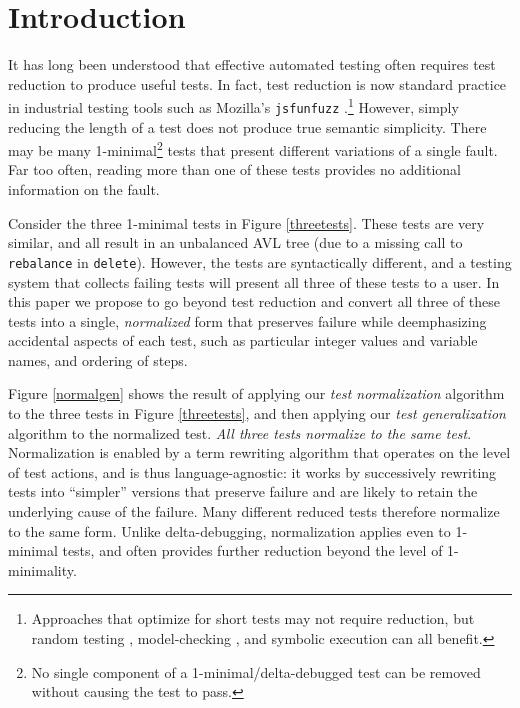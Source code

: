 \section{Introduction}

It has long been understood that effective automated testing often requires
test reduction \cite{DD,MinUnit,TCminim,ICSEDiff} to produce useful tests.  In fact, test reduction is
now standard practice in industrial testing tools such as Mozilla's
{\tt jsfunfuzz} \cite{jsfunfuzz,jsfunfuzz2,lithium}.\footnote{Approaches that
  optimize for short tests \cite{SoftBET,FA11} may not require reduction, but random
  testing \cite{RandFormal,HamletOnly}, model-checking
  \cite{Gastin04minimizationof}, and symbolic execution \cite{issta14}
  can all benefit.}  However, simply reducing the length of a test
does not produce true semantic simplicity.  There may be many
1-minimal\footnote{No
  single component of a 1-minimal/delta-debugged \cite{DD} test can be removed without
  causing the test to pass.} tests
that present different variations of a single fault.  Far too often,
reading more than one of these tests provides no
additional information on the fault.

Consider the three 1-minimal tests in Figure
\ref{threetests}.  These tests are very similar, and all result
in an unbalanced AVL tree (due to a missing call to {\tt rebalance} in
{\tt delete}).  However, the tests are syntactically different,
and a testing system that collects failing tests will present all
three of these tests to a user.  In this paper we propose to go beyond test reduction
and convert all three of these
tests into a single, \emph{normalized} form that preserves failure
while deemphasizing accidental aspects of each test, such as
particular integer values and variable names, and ordering of steps.

Figure \ref{normalgen} shows the result of applying our \emph{test
  normalization} algorithm to the three tests in Figure
\ref{threetests}, and then applying our \emph{test
  generalization} algorithm to the normalized test.  \emph{All
  three tests normalize to the same test}.  Normalization is
enabled by a term rewriting algorithm \cite{term2,term1} that operates
on the level of test actions, and is thus language-agnostic:
it works by successively rewriting tests into ``simpler''
versions that preserve failure and are likely to retain the
underlying cause of the failure. Many
different reduced tests therefore normalize to the same form.
Unlike delta-debugging, normalization applies even to 1-minimal tests,
and often provides further reduction beyond the level of 1-minimality.

